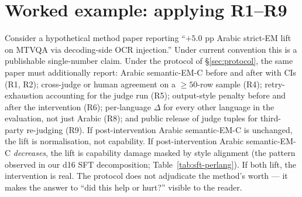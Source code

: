 \section{Worked example: applying R1--R9}
\label{app:protocol-example}

Consider a hypothetical method paper reporting ``$+5.0$ pp Arabic strict-EM lift on MTVQA via decoding-side OCR injection.'' Under current convention this is a publishable single-number claim. Under the protocol of \S\ref{sec:protocol}, the same paper must additionally report: Arabic semantic-EM-C before and after with CIs (R1, R2); cross-judge or human agreement on a $\geq 50$-row sample (R4); retry-exhaustion accounting for the judge run (R5); output-style penalty before and after the intervention (R6); per-language $\Delta$ for every other language in the evaluation, not just Arabic (R8); and public release of judge tuples for third-party re-judging (R9). If post-intervention Arabic semantic-EM-C is unchanged, the lift is normalisation, not capability. If post-intervention Arabic semantic-EM-C \emph{decreases}, the lift is capability damage masked by style alignment (the pattern observed in our d16 SFT decomposition; Table~\ref{tab:sft-perlang}). If both lift, the intervention is real. The protocol does not adjudicate the method's worth --- it makes the answer to ``did this help or hurt?'' visible to the reader.
